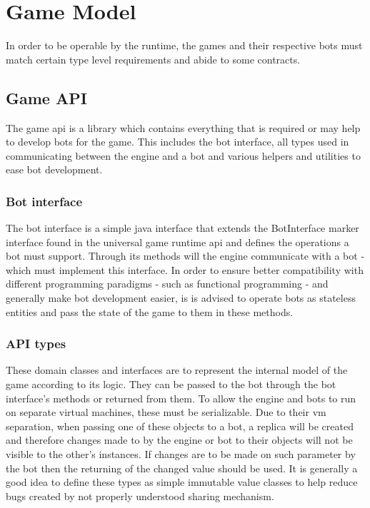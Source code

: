 
%

\chapter{Game Model}\label{sect:GameModel}

In order to be operable by the runtime, the games and their respective bots must match certain type level requirements and abide to some contracts.

	\section{Game API}
	
	The game api is a library which contains everything that is required or may help to develop bots for the game. This includes the bot interface, all types used in communicating between the engine and a bot and various helpers and utilities to ease bot development.

		\subsection*{Bot interface}
		
		The bot interface is a simple java interface that extends the BotInterface marker interface found in the universal game runtime api and defines the operations a bot must support. Through its methods will the engine communicate with a bot - which must implement this interface. In order to ensure better compatibility with different programming paradigms - such as functional programming - and generally make bot development easier, is is advised to operate bots as stateless entities and pass the state of the game to them in these methods. 
		
		\subsection*{API types}

		These domain classes and interfaces are to represent the internal model of the game according to its logic. They can be passed to the bot through the bot interface's methods or returned from them. To allow the engine and bots to run on separate virtual machines, these must be serializable. Due to their vm separation, when passing one of these objects to a bot, a replica will be created and therefore changes made to by the engine or bot to their objects will not be visible to the other's instances. If changes are to be made on such parameter by the bot then the returning of the changed value should be used. It is generally a good idea to define these types as simple immutable value classes to help reduce bugs created by not properly understood sharing mechanism.
		
